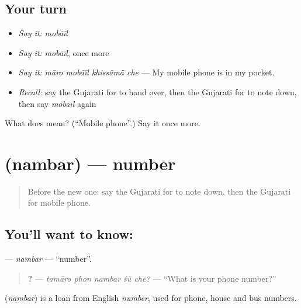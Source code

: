 \subsection*{Your turn}
\begin{itemize}
\raggedright
  \item \emph{Say it:} \emph{mobāīl}
  \item \emph{Say it:} \emph{mobāīl}, once more
  \item \emph{Say it:} \emph{māro mobāīl khissāmā̃ che} — My mobile phone is in my pocket.
  \item \emph{Recall:} say the Gujarati for to hand over, then the Gujarati for to note down, then say \emph{mobāīl} again
\end{itemize}

\begin{tcolorbox}[breakable,colback=teal!4,colframe=teal!35!black,title={Before you move on}]
What does  mean? (\textquotedblleft{}Mobile phone\textquotedblright{}.) Say it once more.
\end{tcolorbox}
\section[\texorpdfstring{\gu{નંબર} (nambar)}{નંબર (nambar)}]{ (nambar) — number}

\label{lesson:GU-C249-nambar}



\begin{quote}
Before the new one: say the Gujarati for to note down, then the Gujarati for mobile phone.
\end{quote}

\subsection*{You'll want to know: }
\textbf{} — \emph{nambar} — \textquotedblleft{}number\textquotedblright{}.

\begin{quote}
\textbf{    ?} — \emph{tamāro phon nambar śũ che?} — \textquotedblleft{}What is your phone number?\textquotedblright{}
\end{quote}

\begin{cousinweb}
\textbf{} (\emph{nambar}) is a loan from English \emph{number}, used for phone, house and bus numbers.
\end{cousinweb}


